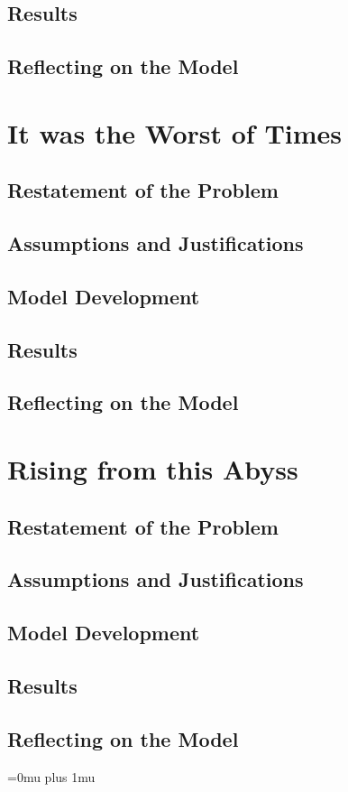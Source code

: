 \documentclass[12pt]{article}
\begin{document}
\subsection{Results}

\subsection{Reflecting on the Model}

\newpage

\section{It was the Worst of Times}

\subsection{Restatement of the Problem}
\subsection{Assumptions and Justifications}
\subsection{Model Development}
\subsection{Results}
\subsection{Reflecting on the Model}

\newpage

\section{Rising from this Abyss}

\subsection{Restatement of the Problem}
\subsection{Assumptions and Justifications}
\subsection{Model Development}
\subsection{Results}
\subsection{Reflecting on the Model}

\newpage

\Urlmuskip=0mu plus 1mu\relax


\end{document}
